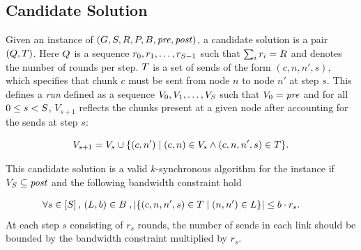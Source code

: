 \subsection{Candidate Solution}
Given an instance of \collectiveproblem
$(G,S,R,P,B,\mathit{pre},\mathit{post})$, a candidate solution
is a pair $(Q,T)$. Here $Q$ is a sequence
$r_0,\allowbreak r_1,\allowbreak \dotsc,\allowbreak r_{S -1}$
such that $\sum_i r_i = R$ and denotes the number of rounds per
step. $T$ is a set of sends of the form $(c,n,n',s)$, which
specifies that chunk $c$ must be sent from node $n$ to node $n'$ at
step $s$. This defines a {\em run} defined as a  sequence
$V_0,V_1,\dotsc,V_{S}$ such that $V_0 = \mathit{pre}$ and for all $0 \leq
s < S$, $V_{s+1}$ reflects the chunks present at a given node
after accounting for the sends at step $s$:

$$ V_{s+1} = V_{s} \cup \{(c,n') \mid (c, n) \in V_{s} \wedge (c, n,
n', s) \in T\}. $$

This candidate solution is a valid $k$-synchronous algorithm for the
instance if $V_{S} \subseteq \mathit{post}$ and the following bandwidth
constraint hold

\begin{align*}
    &\begin{aligned}
        \forall &s\in\left[S\right],\,(L,b)\in B \;, |\{(c,n,n',s)\in T \;|\; (n,n')\in L\}|\leq b \cdot r_s.
    \end{aligned}
\end{align*}
At each step $s$ consisting of $r_s$ rounds, the number of sends in
each link should be bounded by the bandwidth constraint multiplied by
$r_s$.

